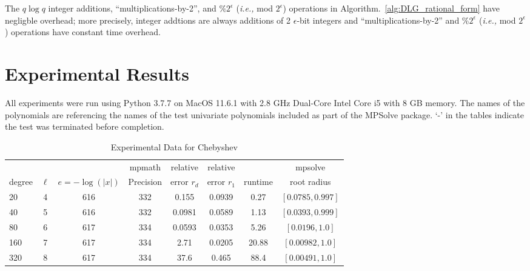 \documentclass[sigconf]{acmart}
\begin{document}
\begin{theorem}
The $q \log q$  integer additions, ``multiplications-by-2'', and $ \%2^\epsilon $ (\emph{i.e.,} mod $ 2^\epsilon $) operations in Algorithm.~\ref{alg:DLG_rational_form} have negligble overhead; more precisely, integer addtions are always additions of 2 $\epsilon$-bit integers and ``multiplications-by-2'' and $ \%2^\epsilon $ (\emph{i.e.,} mod $ 2^\epsilon $) operations have constant time overhead.
\end{theorem}

\section{Experimental Results}

All experiments were run using Python 3.7.7 on MacOS 11.6.1 with 2.8 GHz Dual-Core Intel Core i5 with 8 GB memory.  The names of the polynomials are referencing the names of the test univariate polynomials included as part of the MPSolve package. `-' in the tables indicate the test was terminated before completion.

\begin{table}[t]
\caption{Experimental Data for Chebyshev}
\label{tab:chebyshev}
\vskip -0.15in
\begin{center}
\begin{small}
\begin{sc}
\begin{tabular}{lccccccc}
\toprule
&  &  & mpmath & relative  & relative &  & mpsolve \\
degree  & $\ell$& $e=-\log(|x|)$& Precision &error $r_d$       & error $r_1$ &runtime& root radius\\
\midrule
 20 & 4 & 616 & 332 & 0.155 & 0.0939 & 0.27 & $[0.0785, 0.997]$\\
 40 & 5 & 616 & 332 & 0.0981 & 0.0589 & 1.13 & $[0.0393, 0.999]$\\
 80 & 6 & 617 & 334 & 0.0593 & 0.0353 & 5.26 & $[0.0196, 1.0]$\\
 160 & 7 & 617 & 334 & 2.71 & 0.0205 & 20.88 & $[0.00982, 1.0]$\\
 320 & 8 & 617 & 334 & 37.6 & 0.465 & 88.4 & $[0.00491, 1.0]$\\
\bottomrule
\end{tabular}
\end{sc}
\end{small}
\end{center}
\vskip 0.05in
\end{table}
\end{document}
